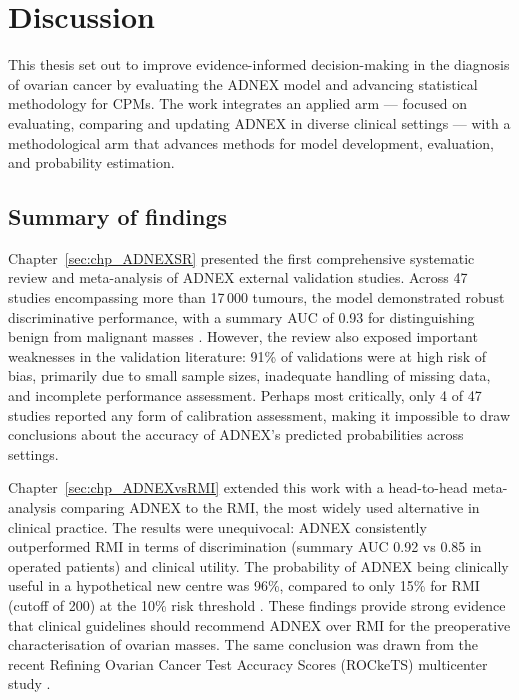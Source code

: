\chapter{Discussion}
\label{ch:discussion}


This thesis set out to improve evidence-informed decision-making in the diagnosis of ovarian cancer by evaluating the \gls{ADNEX} model and advancing statistical methodology for \glspl{CPM}. The work integrates an applied arm --- focused on evaluating, comparing and updating \gls{ADNEX} in diverse clinical settings --- with a methodological arm that advances methods for model development, evaluation, and probability estimation. 

\section{Summary of findings}

Chapter~\ref{sec:chp_ADNEXSR} presented the first comprehensive systematic review and meta-analysis of \gls{ADNEX} external validation studies. Across 47 studies encompassing more than 17\,000 tumours, the model demonstrated robust discriminative performance, with a summary \gls{AUC} of 0.93 for distinguishing benign from malignant masses \cite{barrenadaADNEXRiskPrediction2024}. However, the review also exposed important weaknesses in the validation literature: 91\% of validations were at high risk of bias, primarily due to small sample sizes, inadequate handling of missing data, and incomplete performance assessment. Perhaps most critically, only 4 of 47 studies reported any form of calibration assessment, making it impossible to draw conclusions about the accuracy of \gls{ADNEX}'s predicted probabilities across settings.

Chapter~\ref{sec:chp_ADNEXvsRMI} extended this work with a head-to-head meta-analysis comparing \gls{ADNEX} to the \gls{RMI}, the most widely used alternative in clinical practice. The results were unequivocal: \gls{ADNEX} consistently outperformed \gls{RMI} in terms of discrimination (summary \gls{AUC} 0.92 vs 0.85 in operated patients) and clinical utility. The probability of \gls{ADNEX} being clinically useful in a hypothetical new centre was 96\%, compared to only 15\% for \gls{RMI} (cutoff of 200) at the 10\% risk threshold \cite{barrenadaHeadHeadComparison2025}. These findings provide strong evidence that clinical guidelines should recommend \gls{ADNEX} over \gls{RMI} for the preoperative characterisation of ovarian masses. The same conclusion was drawn from the recent Refining Ovarian Cancer Test Accuracy Scores (ROCkeTS) multicenter study \cite{sundarRiskpredictionModelsPostmenopausal2024,sundarDiagnosticTestsOvarian2026}.

